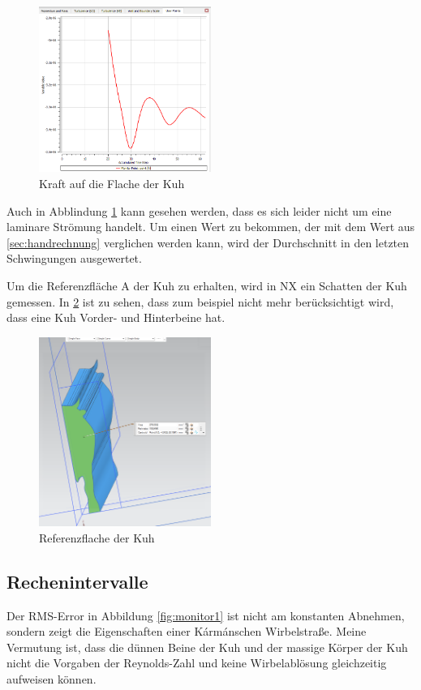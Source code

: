 \documentclass[a4paper,12pt]{article}
\begin{document}
\begin{figure}[h]
    \centering
    \includegraphics[width=0.5\textwidth]{force.PNG}
    \caption{Kraft auf die Flache der Kuh}
    \label{fig:F}
\end{figure}

Auch in Abblindung \ref{fig:F} kann gesehen werden, dass es sich leider nicht um eine laminare Strömung handelt. Um einen Wert zu bekommen, der mit dem Wert aus \ref{sec:handrechnung} verglichen werden kann, wird der Durchschnitt in den letzten Schwingungen ausgewertet.

Um die Referenzfläche A der Kuh zu erhalten, wird in NX ein Schatten der Kuh gemessen. In \ref{fig:A} ist zu sehen, dass zum beispiel nicht mehr berücksichtigt wird, dass eine Kuh Vorder- und Hinterbeine hat.


\begin{figure}[h]
    \centering
    \includegraphics[width=0.5\textwidth]{surface.PNG}
    \caption{Referenzflache der Kuh}
    \label{fig:A}
\end{figure}

\subsection{Rechenintervalle}
Der RMS-Error in Abbildung \ref{fig:monitor1} ist nicht am konstanten Abnehmen, sondern zeigt die Eigenschaften einer Kármánschen Wirbelstraße. Meine Vermutung ist, dass die dünnen Beine der Kuh und der massige Körper der Kuh nicht die Vorgaben der Reynolds-Zahl und keine Wirbelablösung gleichzeitig aufweisen können.
\end{document}

